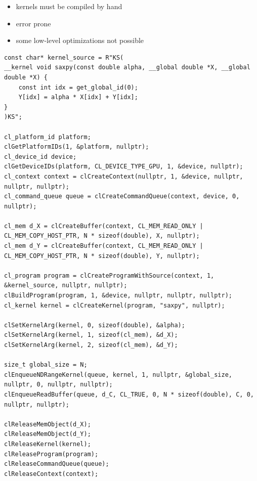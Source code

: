 \begin{disadvantagebox}
    \begin{itemize}
        \item kernels must be compiled by hand
        \item error prone
        \item some low-level optimizations not possible
    \end{itemize}
\end{disadvantagebox}


\begin{listing}
    \begin{verbatim}
const char* kernel_source = R"KS(
__kernel void saxpy(const double alpha, __global double *X, __global double *X) {
    const int idx = get_global_id(0);
    Y[idx] = alpha * X[idx] + Y[idx];
}
)KS";

cl_platform_id platform;
clGetPlatformIDs(1, &platform, nullptr);
cl_device_id device;
clGetDeviceIDs(platform, CL_DEVICE_TYPE_GPU, 1, &device, nullptr);
cl_context context = clCreateContext(nullptr, 1, &device, nullptr, nullptr, nullptr);
cl_command_queue queue = clCreateCommandQueue(context, device, 0, nullptr);

cl_mem d_X = clCreateBuffer(context, CL_MEM_READ_ONLY | CL_MEM_COPY_HOST_PTR, N * sizeof(double), X, nullptr);
cl_mem d_Y = clCreateBuffer(context, CL_MEM_READ_ONLY | CL_MEM_COPY_HOST_PTR, N * sizeof(double), Y, nullptr);

cl_program program = clCreateProgramWithSource(context, 1, &kernel_source, nullptr, nullptr);
clBuildProgram(program, 1, &device, nullptr, nullptr, nullptr);
cl_kernel kernel = clCreateKernel(program, "saxpy", nullptr);

clSetKernelArg(kernel, 0, sizeof(double), &alpha);
clSetKernelArg(kernel, 1, sizeof(cl_mem), &d_X);
clSetKernelArg(kernel, 2, sizeof(cl_mem), &d_Y);

size_t global_size = N;
clEnqueueNDRangeKernel(queue, kernel, 1, nullptr, &global_size, nullptr, 0, nullptr, nullptr);
clEnqueueReadBuffer(queue, d_C, CL_TRUE, 0, N * sizeof(double), C, 0, nullptr, nullptr);

clReleaseMemObject(d_X); 
clReleaseMemObject(d_Y);
clReleaseKernel(kernel); 
clReleaseProgram(program);
clReleaseCommandQueue(queue); 
clReleaseContext(context);
    \end{verbatim}
    \caption{%
    SAXPY example using \gls{opencl}.
    }
    \label{code:opencl_example}
\end{listing}






